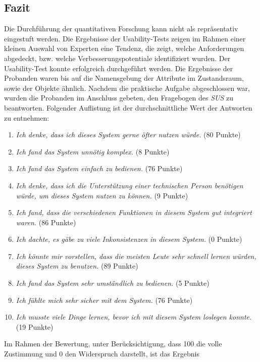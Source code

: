     \subsection{Fazit}
    \label{subsec:usabilityFazit}
        Die Durchführung der quantitativen Forschung kann nicht als repräsentativ eingestuft werden. Die Ergebnisse der 
        Usability-Tests zeigen im Rahmen einer kleinen Auswahl von Experten eine Tendenz, die zeigt, welche Anforderungen abgedeckt, bzw. 
        welche Verbesserungspotentiale identifiziert wurden. Der Usability-Test konnte erfolgreich durchgeführt werden. 
        Die Ergebnisse der Probanden waren bis auf die Namensgebung der Attribute im Zustandsraum, sowie der Objekte ähnlich. 
        Nachdem die praktische Aufgabe abgeschlossen war, wurden die Probanden im Anschluss gebeten, den Fragebogen des \textit{SUS} zu 
        beantworten. Folgender Auflistung ist der durchschnittliche Wert der Antworten zu entnehmen:
        \begin{enumerate}
            \item \textit{Ich denke, dass ich dieses System gerne öfter nutzen würde.} (80 Punkte)
            \item \textit{Ich fand das System unnötig komplex.} (8 Punkte)
            \item \textit{Ich fand das System einfach zu bedienen.} (76 Punkte)
            \item \textit{Ich denke, dass ich die Unterstützung einer technischen Person benötigen würde, um dieses System nutzen zu können.} (9 Punkte)
            \item \textit{Ich fand, dass die verschiedenen Funktionen in diesem System gut integriert waren.} (86 Punkte)
            \item \textit{Ich dachte, es gäbe zu viele Inkonsistenzen in diesem System.} (0 Punkte)
            \item \textit{Ich könnte mir vorstellen, dass die meisten Leute sehr schnell lernen würden, dieses System zu benutzen.} (89 Punkte)
            \item \textit{Ich fand das System sehr umständlich zu bedienen.} (5 Punkte)
            \item \textit{Ich fühlte mich sehr sicher mit dem System.} (76 Punkte)
            \item \textit{Ich musste viele Dinge lernen, bevor ich mit diesem System loslegen konnte.} (19 Punkte)
        \end{enumerate}
        Im Rahmen der Bewertung, unter Berücksichtigung, dass 100 die volle Zustimmung und 0 den Widerspruch darstellt, ist das Ergebnis 
